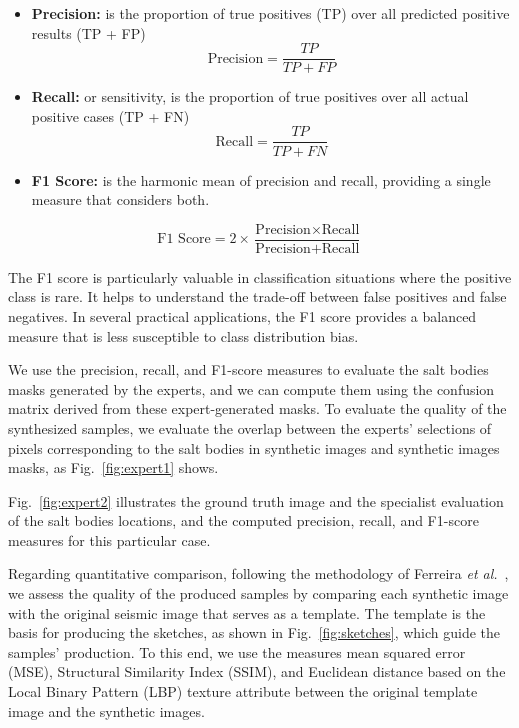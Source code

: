 \documentclass{ieeeaccess}
\begin{document}
\begin{itemize}
    \item \textbf{Precision:} is the proportion of true positives (TP) over all predicted positive results (TP + FP)
    \begin{equation}
    \text{Precision} = \frac{TP}{TP + FP}
    \end{equation}

    \item \textbf{Recall:} or sensitivity, is the proportion of true positives over all actual positive cases (TP + FN)
    \begin{equation}
    \text{Recall} = \frac{TP}{TP + FN}
    \end{equation}


    \item \textbf{F1 Score:} is the harmonic mean of precision and recall, providing a single measure that considers both. 

\end{itemize}
    \begin{equation}
    \text{F1 Score} = 2 \times \frac{\text{Precision} \times \text{Recall}}{\text{Precision} + \text{Recall}}
    \end{equation}
    
 The F1 score is particularly valuable in classification situations where the positive class is rare. It helps to understand the trade-off between false positives and false negatives. In several practical applications, the F1 score provides a balanced measure that is less susceptible to class distribution bias.

We use the precision, recall, and F1-score measures to evaluate the salt bodies masks generated by the experts, and we can compute them using the confusion matrix derived from these expert-generated masks. To evaluate the quality of the synthesized samples, we evaluate the overlap between the experts' selections of pixels corresponding to the salt bodies in synthetic images and synthetic images masks, as Fig.~\ref{fig:expert1} shows.

Fig.~\ref{fig:expert2} illustrates the ground truth image and the specialist evaluation of the salt bodies locations, and the computed precision, recall, and F1-score measures for this particular case.

Regarding quantitative comparison, following the methodology of Ferreira \emph{et al.}~\cite{Ferreira2020}, we assess the quality of the produced samples by comparing each synthetic image with the original seismic image that serves as a template. The template is the basis for producing the sketches, as shown in Fig.~\ref{fig:sketches}, which guide the samples' production. To this end, we use the measures mean squared error (MSE), Structural Similarity Index (SSIM), and Euclidean distance based on the Local Binary Pattern (LBP) texture attribute between the original template image and the synthetic images.
\end{document}
